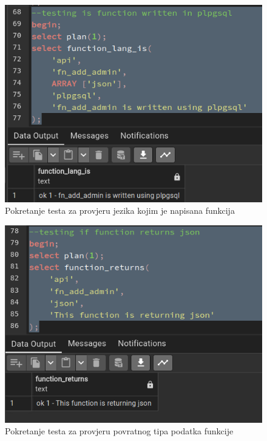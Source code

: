 				\begin{figure}[H]
					\centering
					\includegraphics[width=\textwidth]{slike/unit_tests/ut_2/func_lang.png}
					\caption{Pokretanje testa za provjeru jezika kojim je napisana funkcija}
					\label{fig: IS2-function_lang}
				\end{figure}
				\begin{figure}[H]
					\centering
					\includegraphics[width=\textwidth]{slike/unit_tests/ut_2/func_return.png}
					\caption{Pokretanje testa za provjeru povratnog tipa podatka funkcije}
					\label{fig: IS2-function_return}
				\end{figure}
